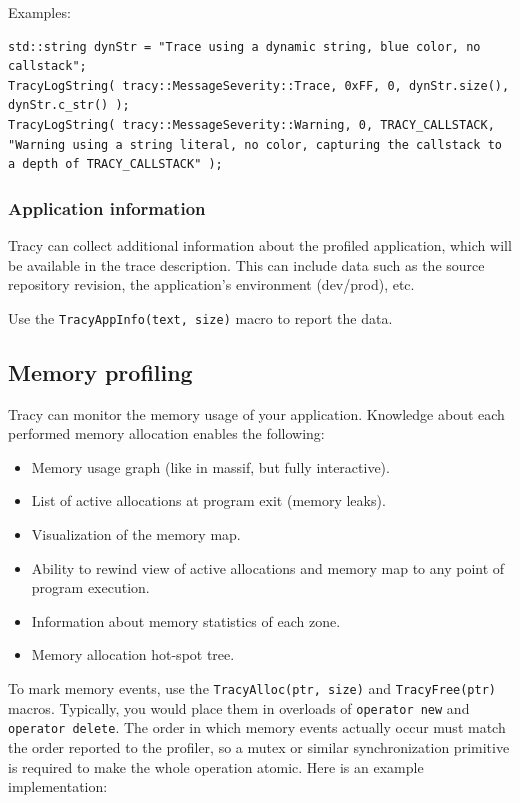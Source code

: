 \documentclass[hidelinks,titlepage,a4paper,twoside]{article}
\begin{document}
Examples:
\begin{lstlisting}
std::string dynStr = "Trace using a dynamic string, blue color, no callstack";
TracyLogString( tracy::MessageSeverity::Trace, 0xFF, 0, dynStr.size(), dynStr.c_str() );
TracyLogString( tracy::MessageSeverity::Warning, 0, TRACY_CALLSTACK, "Warning using a string literal, no color, capturing the callstack to a depth of TRACY_CALLSTACK" );
\end{lstlisting}


\subsubsection{Application information}
\label{appinfo}

Tracy can collect additional information about the profiled application, which will be available in the trace description. This can include data such as the source repository revision, the application's environment (dev/prod), etc.

Use the \texttt{TracyAppInfo(text, size)} macro to report the data.

\subsection{Memory profiling}
\label{memoryprofiling}

Tracy can monitor the memory usage of your application. Knowledge about each performed memory allocation enables the following:

\begin{itemize}
\item Memory usage graph (like in massif, but fully interactive).
\item List of active allocations at program exit (memory leaks).
\item Visualization of the memory map.
\item Ability to rewind view of active allocations and memory map to any point of program execution.
\item Information about memory statistics of each zone.
\item Memory allocation hot-spot tree.
\end{itemize}

To mark memory events, use the \texttt{TracyAlloc(ptr, size)} and \texttt{TracyFree(ptr)} macros. Typically, you would place them in overloads of \texttt{operator new} and \texttt{operator delete}. The order in which memory events actually occur must match the order reported to the profiler, so a mutex or similar synchronization primitive is required to make the whole operation atomic. Here is an example implementation:
\end{document}
